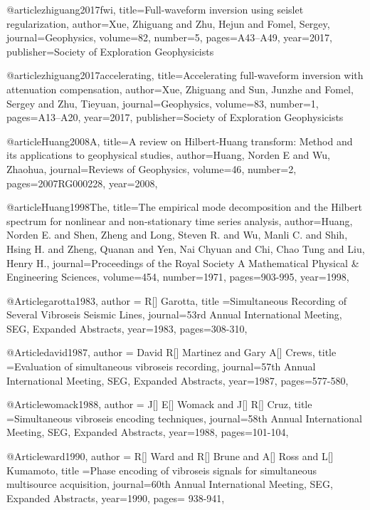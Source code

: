 @article{zhiguang2017fwi,
  title={Full-waveform inversion using seislet regularization},
  author={Xue, Zhiguang and Zhu, Hejun and Fomel, Sergey},
  journal={Geophysics},
  volume={82},
  number={5},
  pages={A43--A49},
  year={2017},
  publisher={Society of Exploration Geophysicists}
}

@article{zhiguang2017accelerating,
  title={Accelerating full-waveform inversion with attenuation compensation},
  author={Xue, Zhiguang and Sun, Junzhe and Fomel, Sergey and Zhu, Tieyuan},
  journal={Geophysics},
  volume={83},
  number={1},
  pages={A13--A20},
  year={2017},
  publisher={Society of Exploration Geophysicists}
}

@article{Huang2008A,
  title={A review on {H}ilbert‐{H}uang transform: {M}ethod and its applications to geophysical studies},
  author={Huang, Norden E and Wu, Zhaohua},
  journal={Reviews of Geophysics},
  volume={46},
  number={2},
  pages={2007RG000228},
  year={2008},
}

@article{Huang1998The,
  title={The empirical mode decomposition and the Hilbert spectrum for nonlinear and non-stationary time series analysis},
  author={Huang, Norden E. and Shen, Zheng and Long, Steven R. and Wu, Manli C. and Shih, Hsing H. and Zheng, Quanan and Yen, Nai Chyuan and Chi, Chao Tung and Liu, Henry H.},
  journal={Proceedings of the Royal Society A Mathematical Physical \& Engineering Sciences},
  volume={454},
  number={1971},
  pages={903-995},
  year={1998},
}


@Article{garotta1983,
  author = {R[] Garotta},
  title ={Simultaneous Recording of Several Vibroseis Seismic Lines},
  journal={53rd Annual International Meeting, SEG, Expanded Abstracts},
  year=1983,
  pages={308-310},
}

@Article{david1987,
  author = {David R[] Martinez and Gary A[] Crews},
  title ={Evaluation of simultaneous vibroseis recording},
  journal={57th Annual International Meeting, SEG, Expanded Abstracts},
  year=1987,
  pages={577-580},
}

@Article{womack1988,
  author = {J[] E[] Womack and J[] R[] Cruz},
  title ={Simultaneous vibroseis encoding techniques},
  journal={58th Annual International Meeting, SEG, Expanded Abstracts},
  year=1988,
  pages={101-104},
}

@Article{ward1990,
  author = {R[] Ward and R[] Brune and A[] Ross and L[] Kumamoto},
  title ={Phase encoding of vibroseis signals for simultaneous multisource acquisition},
  journal={60th Annual International Meeting, SEG, Expanded Abstracts},
  year=1990,
  pages={ 938-941},
}

